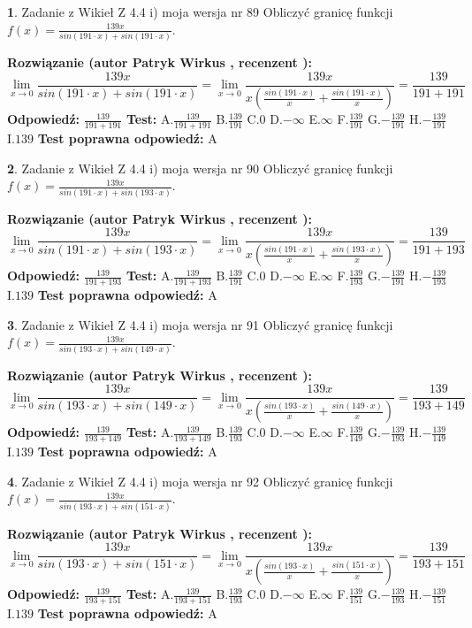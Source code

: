 \documentclass[12pt, a4paper]{article}
\theoremstyle{definition} %
\newtheorem{zad}{}
\newcommand{\zadStart}[1]{\begin{zad}#1\newline}
\newcommand{\zadStop}{\end{zad}}
\newcommand{\rozwStart}[2]{\noindent \textbf{Rozwiązanie (autor #1 , recenzent #2): }\newline}
\newcommand{\rozwStop}{\newline}
\newcommand{\odpStart}{\noindent \textbf{Odpowiedź:}\newline}
\newcommand{\odpStop}{\newline}
\newcommand{\testStart}{\noindent \textbf{Test:}\newline}
\newcommand{\testStop}{\newline}
\newcommand{\kluczStart}{\noindent \textbf{Test poprawna odpowiedź:}\newline}
\newcommand{\kluczStop}{\newline}
\begin{document}
\zadStart{Zadanie z Wikieł Z 4.4 i) moja wersja nr 89}
Obliczyć granicę funkcji $f(x)=\frac{139x}{sin(191\cdot x) +sin(191\cdot x)}$.
\zadStop
\rozwStart{Patryk Wirkus}{}
$$\lim\limits_{x\to 0}\frac{139x}{sin(191\cdot x) +sin(191\cdot x)}=\lim\limits_{x\to 0}\frac{139x}{x(\frac{sin(191\cdot x)}{x}+\frac{sin(191\cdot x)}{x})}=\frac{139}{191+191}$$
\rozwStop
\odpStart
$\frac{139}{191+191}$
\odpStop
\testStart
A.$\frac{139}{191+191}$
B.$\frac{139}{191}$
C.$0$
D.$-\infty$
E.$\infty$
F.$\frac{139}{191}$
G.$-\frac{139}{191}$
H.$-\frac{139}{191}$
I.$139$
\testStop
\kluczStart
A
\kluczStop



\zadStart{Zadanie z Wikieł Z 4.4 i) moja wersja nr 90}
Obliczyć granicę funkcji $f(x)=\frac{139x}{sin(191\cdot x) +sin(193\cdot x)}$.
\zadStop
\rozwStart{Patryk Wirkus}{}
$$\lim\limits_{x\to 0}\frac{139x}{sin(191\cdot x) +sin(193\cdot x)}=\lim\limits_{x\to 0}\frac{139x}{x(\frac{sin(191\cdot x)}{x}+\frac{sin(193\cdot x)}{x})}=\frac{139}{191+193}$$
\rozwStop
\odpStart
$\frac{139}{191+193}$
\odpStop
\testStart
A.$\frac{139}{191+193}$
B.$\frac{139}{191}$
C.$0$
D.$-\infty$
E.$\infty$
F.$\frac{139}{193}$
G.$-\frac{139}{191}$
H.$-\frac{139}{193}$
I.$139$
\testStop
\kluczStart
A
\kluczStop



\zadStart{Zadanie z Wikieł Z 4.4 i) moja wersja nr 91}
Obliczyć granicę funkcji $f(x)=\frac{139x}{sin(193\cdot x) +sin(149\cdot x)}$.
\zadStop
\rozwStart{Patryk Wirkus}{}
$$\lim\limits_{x\to 0}\frac{139x}{sin(193\cdot x) +sin(149\cdot x)}=\lim\limits_{x\to 0}\frac{139x}{x(\frac{sin(193\cdot x)}{x}+\frac{sin(149\cdot x)}{x})}=\frac{139}{193+149}$$
\rozwStop
\odpStart
$\frac{139}{193+149}$
\odpStop
\testStart
A.$\frac{139}{193+149}$
B.$\frac{139}{193}$
C.$0$
D.$-\infty$
E.$\infty$
F.$\frac{139}{149}$
G.$-\frac{139}{193}$
H.$-\frac{139}{149}$
I.$139$
\testStop
\kluczStart
A
\kluczStop



\zadStart{Zadanie z Wikieł Z 4.4 i) moja wersja nr 92}
Obliczyć granicę funkcji $f(x)=\frac{139x}{sin(193\cdot x) +sin(151\cdot x)}$.
\zadStop
\rozwStart{Patryk Wirkus}{}
$$\lim\limits_{x\to 0}\frac{139x}{sin(193\cdot x) +sin(151\cdot x)}=\lim\limits_{x\to 0}\frac{139x}{x(\frac{sin(193\cdot x)}{x}+\frac{sin(151\cdot x)}{x})}=\frac{139}{193+151}$$
\rozwStop
\odpStart
$\frac{139}{193+151}$
\odpStop
\testStart
A.$\frac{139}{193+151}$
B.$\frac{139}{193}$
C.$0$
D.$-\infty$
E.$\infty$
F.$\frac{139}{151}$
G.$-\frac{139}{193}$
H.$-\frac{139}{151}$
I.$139$
\testStop
\kluczStart
A
\kluczStop
\end{document}
